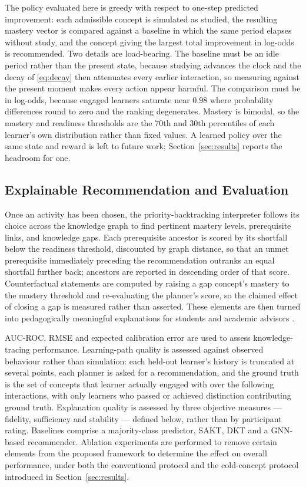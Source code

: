 The policy evaluated here is greedy with respect to one-step predicted improvement: each
admissible concept is simulated as studied, the resulting mastery vector is compared
against a baseline in which the same period elapses without study, and the concept giving
the largest total improvement in log-odds is recommended. Two details are load-bearing.
The baseline must be an idle period rather than the present state, because studying
advances the clock and the decay of \eqref{eq:decay} then attenuates every earlier
interaction, so measuring against the present moment makes every action appear harmful.
The comparison must be in log-odds, because engaged learners saturate near $0.98$ where
probability differences round to zero and the ranking degenerates. Mastery is bimodal, so
the mastery and readiness thresholds are the 70th and 30th percentiles of each learner's
own distribution rather than fixed values. A learned policy over the same state and reward
is left to future work; Section~\ref{sec:results} reports the headroom for one.


\subsection{Explainable Recommendation and Evaluation}

Once an activity has been chosen, the priority-backtracking interpreter follows its choice
across the knowledge graph to find pertinent mastery levels, prerequisite links, and
knowledge gaps. Each prerequisite ancestor is scored by its shortfall below the readiness
threshold, discounted by graph distance, so that an unmet prerequisite immediately
preceding the recommendation outranks an equal shortfall further back; ancestors are
reported in descending order of that score. Counterfactual statements are computed by
raising a gap concept's mastery to the mastery threshold and re-evaluating the planner's
score, so the claimed effect of closing a gap is measured rather than asserted. These
elements are then turned into pedagogically meaningful explanations for students and
academic advisors \cite{zhang2023finegrained}.

AUC-ROC, RMSE and expected calibration error are used to assess knowledge-tracing
performance. Learning-path quality is assessed against observed behaviour rather than
simulation: each held-out learner's history is truncated at several points, each planner
is asked for a recommendation, and the ground truth is the set of concepts that learner
actually engaged with over the following interactions, with only learners who passed or
achieved distinction contributing ground truth. Explanation quality is assessed by three
objective measures --- fidelity, sufficiency and stability --- defined below, rather than by participant rating. Baselines comprise a
majority-class predictor, SAKT, DKT and a GNN-based recommender. Ablation experiments are
performed to remove certain elements from the proposed framework to determine the effect
on overall performance, under both the conventional protocol and the cold-concept protocol
introduced in Section~\ref{sec:results}.

